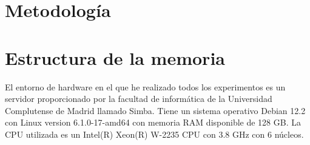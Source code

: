 \section{Metodología} \label{Subsubsec: 1_3}
\section{Estructura de la memoria} \label{Subsubsec: 1_4}
  
El entorno de hardware en el que he realizado todos los experimentos es un servidor proporcionado por la facultad de informática de la Universidad Complutense de Madrid llamado Simba. Tiene un sistema operativo Debian 12.2 con Linux version 6.1.0-17-amd64 con memoria RAM disponible de 128 GB. La CPU utilizada es un Intel(R) Xeon(R) W-2235 CPU con 3.8 GHz con 6 núcleos. 


